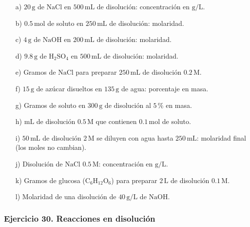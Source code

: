 \begin{enumerate}
    \item[a)] $20\,\mathrm{g}$ de $\mathrm{NaCl}$ en
    $500\,\mathrm{mL}$ de disolución:
    concentración en $\mathrm{g/L}$.

    \item[b)] $0.5\,\mathrm{mol}$ de soluto en
    $250\,\mathrm{mL}$ de disolución: molaridad.

    \item[c)] $4\,\mathrm{g}$ de $\mathrm{NaOH}$ en
    $200\,\mathrm{mL}$ de disolución: molaridad.

    \item[d)] $9.8\,\mathrm{g}$ de $\mathrm{H_2SO_4}$ en
    $500\,\mathrm{mL}$ de disolución: molaridad.

    \item[e)] Gramos de $\mathrm{NaCl}$ para preparar
    $250\,\mathrm{mL}$ de disolución $0.2\,\mathrm{M}$.

    \item[f)] $15\,\mathrm{g}$ de azúcar disueltos en
    $135\,\mathrm{g}$ de agua: porcentaje en masa.

    \item[g)] Gramos de soluto en $300\,\mathrm{g}$ de disolución
    al $5\,\%$ en masa.

    \item[h)] $\mathrm{mL}$ de disolución $0.5\,\mathrm{M}$
    que contienen $0.1\,\mathrm{mol}$ de soluto.

    \item[i)] $50\,\mathrm{mL}$ de disolución $2\,\mathrm{M}$
    se diluyen con agua hasta $250\,\mathrm{mL}$:
    molaridad final (los moles no cambian).

    \item[j)] Disolución de $\mathrm{NaCl}$ $0.5\,\mathrm{M}$:
    concentración en $\mathrm{g/L}$.

    \item[k)] Gramos de glucosa ($\mathrm{C_6H_{12}O_6}$)
    para preparar $2\,\mathrm{L}$ de disolución $0.1\,\mathrm{M}$.

    \item[l)] Molaridad de una disolución de
    $40\,\mathrm{g/L}$ de $\mathrm{NaOH}$.
\end{enumerate}

\subsubsection*{Ejercicio 30. Reacciones en disolución}

